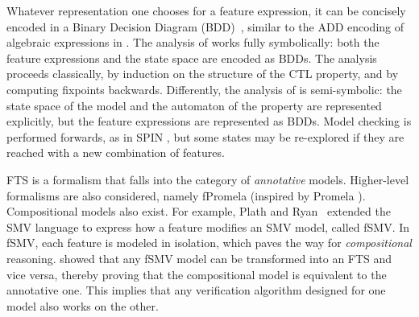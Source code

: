 Whatever representation one chooses for a feature expression, it can be concisely encoded in a Binary Decision Diagram (BDD)~\cite{Bryant1992,Classen2014}, similar to the ADD encoding of algebraic expressions in .
The analysis of \citet{Classen2014} works fully symbolically: both the feature expressions and the state space are encoded as BDDs. The analysis proceeds classically, by induction on the structure of the CTL property, and by computing fixpoints backwards.
Differently, the analysis of \citet{Classen2013} is semi-symbolic: the state space of the model and the automaton of the property are represented explicitly, but the feature expressions are represented as BDDs. Model checking is performed forwards, as in SPIN \cite{Holzmann:2003}, but some states may be re-explored if they are reached with a new combination of features.


FTS is a formalism that falls into the category of \emph{annotative} models. Higher-level formalisms are also considered, namely fPromela \cite{Classen2013} (inspired by Promela \cite{Holzmann:2003}). Compositional models also exist. For example, Plath and Ryan~\cite{Plath2001} extended the SMV language to express how a feature modifies an SMV model, called fSMV. 
In fSMV, each feature is modeled in isolation, which paves the way for \emph{compositional} reasoning. \citet{Classen2014} showed that any fSMV model can be transformed into an FTS and vice versa, thereby proving that the compositional model is equivalent to the annotative one. This implies that any verification algorithm designed for one model also works on the other.

